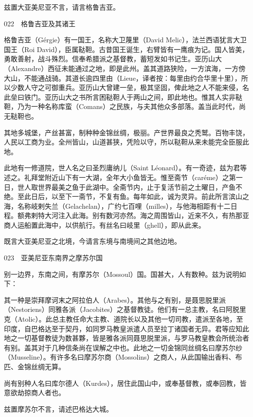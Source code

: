 \documentclass[12pt,UTF8]{ctexbook}
\begin{document}
兹置大亚美尼亚不言，请言格鲁吉亚。

022　格鲁吉亚及其诸王

格鲁吉亚（Gérgie）有一国王，名称大卫蔑里（David Melic），法兰西语犹言大卫国王（Roi David），臣属鞑靼。古昔国王诞生，右臂皆有一鹰痕为记。国人皆美，勇敢善射，战斗殊烈。信奉希腊派之基督教，蓄短发如书记生。亚历山大（Alexandre）西征未能通过之地，即是此州。盖其道路狭险，一方滨海，一方傍大山，不能通战骑。其道长逾四里由（Lieue，译者按：每里由约合华里十里），所以少数人守之可御重兵。亚历山大曾建一垒，极其坚固，俾此地之人不能来侵，名此垒曰铁门。亚历山大之书所言困鞑靼人于两山之间，即此地也。惟其人实非鞑靼，乃为一种名称库蛮（Comans）之民族，与夫其他众多部落。盖当此时代，尚无鞑靼也。

其地多城堡，产丝甚富，制种种金锦丝绸，极丽。产世界最良之秃鹫。百物丰饶，人民以工商为业。全州皆山，山道甚狭，凭险以守，所以鞑靼从来未能完全臣服此地。

此地有一修道院，世人名之曰圣烈庸纳儿（Saint Léonard）。有一奇迹，兹为君等述之。礼拜堂附近山下有一大湖，全年大小鱼皆无。惟至斋节（caréme）之第一日，世人取世界最美之鱼于此湖中。全斋节内，止于复活节前之土曜日，产鱼不绝。至此日后，以至下一斋节，不复有鱼。每年如此，诚为灵异。前此所言滨山之海，名称岐剌失兰（Gelachelan），广约七百哩（milles），与他海相距有十二日程。额弗剌特大河注入此海。别有数河亦然。海之周围皆山，近来不久，有热那亚商人运船置此海中，以供航行。有丝名曰岐里（ghell），即从此来。

既言大亚美尼亚之北境，今请言东境与南境间之其他边地。





023　亚美尼亚东南界之摩苏尔国

别一边界，东南之间，有摩苏尔（Mossoul）国。国甚大，人有数种。兹为说明如下：

其一种是崇拜摩诃末之阿拉伯人（Arabes）。其他与之有别，是聂思脱里派（Nestoriens）同雅各派（Jacobites）之基督教徒。他们有一总主教，名曰阿脱里克（Atolic）。此总主教任命大主教、道院长以及其他一切司教，遣派至各地，至印度，自巴格达至于契丹，如同罗马教皇派遣人员至拉丁诸国者无异。君等应知此地之一切基督教徒为数甚夥，皆是雅各派同聂思脱里派，与罗马教皇教会所统治者有别。盖其对于几种信条尚在误解之中也。此地之一切金锦同丝绸名曰摩苏尔纱（Musseline）。有许多名曰摩苏尔商（Mossolins）之商人，从此国输出香料、布匹、金锦丝绸无算。

尚有别种人名曰库尔德人（Kurdes），居住此国山中，或奉基督教，或奉回教，皆意欲劫掠商人者也。

兹置摩苏尔不言，请述巴格达大城。
\end{document}
